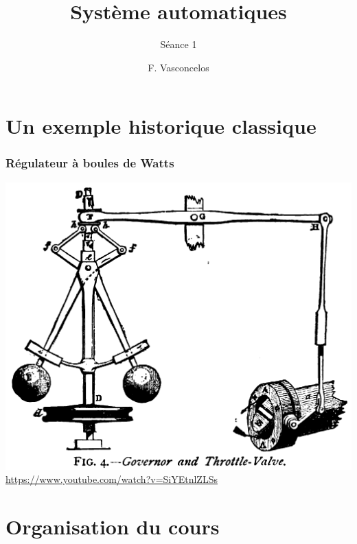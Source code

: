 \documentclass[10pt]{beamer}
\title{Système automatiques}
\subtitle{Séance 1}
\date{}
\author{F. Vasconcelos}
\institute{ESME Sudria Lille}
\begin{document}
\maketitle

\section{Un exemple historique \og classique\fg}

\begin{frame}
    \frametitle{Régulateur à boules de Watts}
    \includegraphics[width=\textwidth]{fig/Centrifugal_governor}
    \url{https://www.youtube.com/watch?v=SiYEtnlZLSs}
\end{frame}

\section{Organisation du cours}

\begin{frame}
    \begin{figure}[!h]
        \begin{center}
            {
            \large
            
            }
        \end{center}
    \end{figure}  
\end{frame}

\begin{frame}
    \begin{figure}[!h]
        \begin{center}
            {
            \large
            
            }
        \end{center}
    \end{figure}  
\end{frame}
\end{document}
